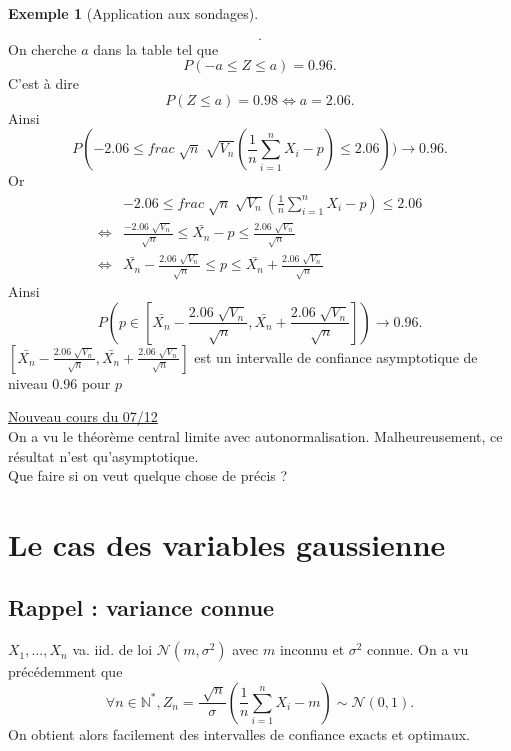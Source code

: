 \documentclass{article}
\theoremstyle{plain}%
\theoremstyle{definition}
\newtheorem{exmp}{Exemple}[section]
\theoremstyle{remark}
\begin{document}
\begin{exmp}[Application aux sondages]
\begin{enumerate}
\[        .\]
        On cherche $ a $ dans la table tel que 
        \[
            P(-a \leq Z \leq a) = 0.96
        .\]
        C'est à dire 
        \[
            P(Z \leq a) = 0.98 \Leftrightarrow a = 2.06
        .\]
        Ainsi 
        \[
            P(-2.06 \leq frac{\sqrt[]{n}}{\sqrt[]{V_n}} (\frac{1}{n}\sum_{i=1}^{n}X_i - p) \leq 2.06)) \to 0.96
        .\]
        Or 
        \begin{align*}
                &-2.06 \leq frac{\sqrt[]{n}}{\sqrt[]{V_n}} (\frac{1}{n}\sum_{i=1}^{n}X_i - p) \leq 2.06 \\
            \Leftrightarrow & \frac{-2.06 \sqrt[]{V_n}}{\sqrt[]{n}} \leq \bar{X_n} - p \leq \frac{2.06 \sqrt[]{V_n}}{\sqrt[]{n}} \\
            \Leftrightarrow & \bar{X_n} - \frac{2.06 \sqrt[]{V_n}}{\sqrt[]{n}} \leq p \leq \bar{X_n} + \frac{2.06 \sqrt[]{V_n}}{\sqrt[]{n}}
        \end{align*}
        Ainsi 
        \[
            P(p \in [\bar{X_n} - \frac{2.06 \sqrt[]{V_n}}{\sqrt[]{n}}, \bar{X_n} + \frac{2.06 \sqrt[]{V_n}}{\sqrt[]{n}}]) \to 0.96
        .\]
        $ [\bar{X_n} - \frac{2.06 \sqrt[]{V_n}}{\sqrt[]{n}}, \bar{X_n} + \frac{2.06 \sqrt[]{V_n}}{\sqrt[]{n}}] $ est un intervalle de confiance asymptotique de niveau 0.96 pour $ p $ 
    \end{enumerate}
\end{exmp}


\underline{Nouveau cours du 07/12} \\
On a vu le théorème central limite avec autonormalisation. Malheureusement, ce résultat n'est qu'asymptotique. \\
Que faire si on veut quelque chose de précis ?

\section{Le cas des variables gaussienne}

\subsection{Rappel : variance connue}

$ X_1, \dots, X_n $ va. iid. de loi $ \mathcal{N}(m,\sigma ^2) $ avec $ m $ inconnu et $ \sigma ^2 $ connue. On a vu précédemment que 
\[
    \forall n \in \mathbb{N}^*, Z_n = \frac{\sqrt[]{n}}{\sigma } (\frac{1}{n}\sum_{i=1}^{n}X_i - m) \sim \mathcal{N}(0,1)
.\]
On obtient alors facilement des intervalles de confiance exacts et optimaux. \\
\end{document}
